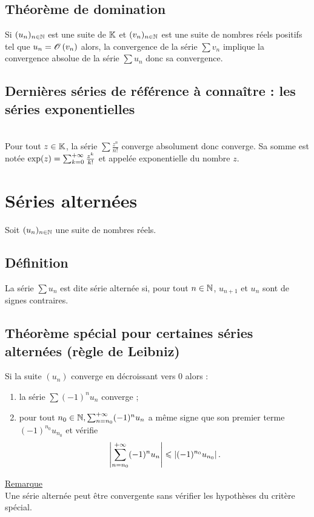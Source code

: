 \subsection{Théorème de domination}
\begin{theo}
    Si \((u_n)_{n\in \mathbb{N} }\) est une suite de \(\mathbb{K}\) et \((v_n)_{n\in \mathbb{N}}\) est une suite de nombres réels positifs tel que \(u_n = \mathscr{O}\left(v_n\right)\) alors, la convergence de la série \(\sum v_n\) implique la convergence absolue de la série \(\sum u_n\) donc sa convergence.
\end{theo}
\subsection{Dernières séries de référence à connaître : les séries exponentielles}
\begin{defprop}
    ~\\
    Pour tout \(z \in  \mathbb{K}\), la série \(\sum \frac{z^n}{n!}\) converge absolument donc converge. Sa somme est notée \(\exp(z) = \sum^{+\infty}_{k=0} \frac{z^k}{k!}\) et appelée exponentielle du nombre \(z\).
\end{defprop}
\section{Séries alternées}
    Soit \((u_n)_{n\in \mathbb{N} }\) une suite de nombres réels.
\subsection{Définition}

\begin{defi}
    La série \(\sum u_n \) est dite série alternée si, pour tout \(n \in  \mathbb{N}\), \(u_{n+1}\) et \(u_n\) sont de signes contraires.
\end{defi}

\subsection{Théorème spécial pour certaines séries alternées (règle de Leibniz)}
\begin{theo}
    Si la suite \((u_n)\) converge en décroissant vers \(0\) alors :
    \begin{enumerate}
        \item la série \(\sum (-1)^n u_n\) converge ;
        \item pour tout \(n_0 \in  \mathbb{N},\sum^{+\infty}_{n=n_0} (-1)^n u_n\) a même signe que son premier terme \((-1)^{n_0} u_{n_0}\) et vérifie 
        \[\left\lvert\sum^{+\infty}_{n=n_0}(-1)^n u_n\right\rvert \leqslant \left\lvert(-1)^{n_0} u_{n_0} \right\rvert.\]
    \end{enumerate}
    \underline{Remarque}\\
    Une série alternée peut être convergente sans vérifier les hypothèses du critère spécial.
\end{theo}